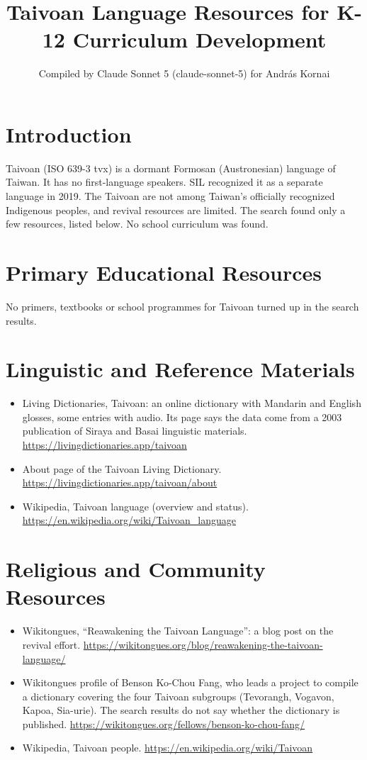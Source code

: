 \documentclass[12pt]{article}
\title{Taivoan Language Resources for K-12 Curriculum Development}
\author{Compiled by Claude Sonnet 5 (claude-sonnet-5) for Andr\'as Kornai}
\date{}
\begin{document}
\maketitle

\section{Introduction}
Taivoan (ISO 639-3 tvx) is a dormant Formosan (Austronesian) language of Taiwan. It has no first-language speakers. SIL recognized it as a separate language in 2019. The Taivoan are not among Taiwan's officially recognized Indigenous peoples, and revival resources are limited. The search found only a few resources, listed below. No school curriculum was found.

\section{Primary Educational Resources}
No primers, textbooks or school programmes for Taivoan turned up in the search results.

\section{Linguistic and Reference Materials}
\begin{itemize}
\item Living Dictionaries, Taivoan: an online dictionary with Mandarin and English glosses, some entries with audio. Its page says the data come from a 2003 publication of Siraya and Basai linguistic materials. \url{https://livingdictionaries.app/taivoan}
\item About page of the Taivoan Living Dictionary. \url{https://livingdictionaries.app/taivoan/about}
\item Wikipedia, Taivoan language (overview and status). \url{https://en.wikipedia.org/wiki/Taivoan_language}
\end{itemize}

\section{Religious and Community Resources}
\begin{itemize}
\item Wikitongues, ``Reawakening the Taivoan Language'': a blog post on the revival effort. \url{https://wikitongues.org/blog/reawakening-the-taivoan-language/}
\item Wikitongues profile of Benson Ko-Chou Fang, who leads a project to compile a dictionary covering the four Taivoan subgroups (Tevorangh, Vogavon, Kapoa, Sia-urie). The search results do not say whether the dictionary is published. \url{https://wikitongues.org/fellows/benson-ko-chou-fang/}
\item Wikipedia, Taivoan people. \url{https://en.wikipedia.org/wiki/Taivoan}
\end{itemize}
\end{document}
